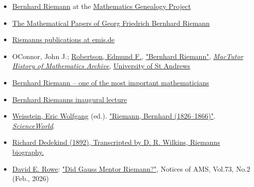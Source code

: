 \begin{itemize}
\tightlist
\item
  {\href{https://mathgenealogy.org/id.php?id=18232}{Bernhard Riemann}{ at the }\href{https://en.wikipedia.org/wiki/Mathematics_Genealogy_Project}{Mathematics Genealogy Project}}
\item
  {\href{http://www.maths.tcd.ie/pub/HistMath/People/Riemann/Papers.html}{The Mathematical Papers of Georg Friedrich Bernhard Riemann}}
\item
  {\href{http://www.emis.de/classics/Riemann/}{Riemann\textquotesingle s publications at emis.de}}
\item
  {O\textquotesingle Connor, John J.; \href{https://en.wikipedia.org/wiki/Edmund_F._Robertson}{Robertson, Edmund F.}, \href{https://mathshistory.st-andrews.ac.uk/Biographies/Riemann.html}{"Bernhard Riemann"}, \emph{\href{https://en.wikipedia.org/wiki/MacTutor_History_of_Mathematics_Archive}{MacTutor History of Mathematics Archive}}, \href{https://en.wikipedia.org/wiki/University_of_St_Andrews}{University of St Andrews}{}}
\item
  {\href{https://web.archive.org/web/20050903035028/http://www.fh-lueneburg.de/u1/gym03/englpage/chronik/riemann/riemann.htm}{Bernhard Riemann {--} one of the most important mathematicians}}
\item
  {\href{https://web.archive.org/web/20160318034045/http://www.maths.tcd.ie/pub/HistMath/People/Riemann/Geom/}{Bernhard Riemann\textquotesingle s inaugural lecture}}
\item
  {\href{https://en.wikipedia.org/wiki/Eric_W._Weisstein}{Weisstein, Eric Wolfgang} (ed.). \href{http://scienceworld.wolfram.com/biography/Riemann.html}{"Riemann, Bernhard (1826{--}1866)"}. \emph{\href{https://en.wikipedia.org/wiki/ScienceWorld}{ScienceWorld}}.{}}
\item
  {\href{https://www.maths.tcd.ie/pub/HistMath/People/Riemann/Leben/Leben.pdf}{Richard Dedekind (1892), Transcripted by D. R. Wilkins, Riemanns biography.}}
\item
  {\href{https://en.wikipedia.org/wiki/David_E._Rowe}{David E. Rowe}: \href{https://www.ams.org/journals/notices/202602/noti3294/noti3294.html}{"Did Gauss Mentor Riemann?"}, Notices of AMS, Vol.73, No.2 (Feb., 2026)}
\end{itemize}





{}
